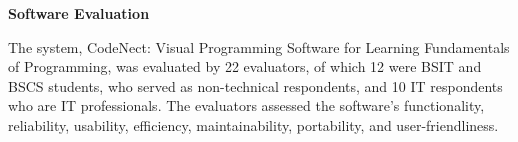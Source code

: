 \flushleft
\textbf{Software Evaluation}
\justifying

\parx
The system, CodeNect: Visual Programming Software for Learning Fundamentals of Programming,
was evaluated by 22 evaluators, of which 12 were BSIT and BSCS students, who served as
non-technical respondents, and 10 IT respondents who are IT professionals. The
evaluators assessed the software’s functionality, reliability, usability, efficiency,
maintainability, portability, and user-friendliness.


% 



% 
% 
